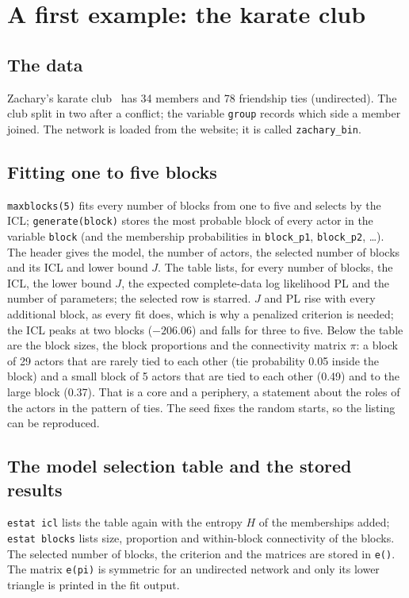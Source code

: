 \chapter{A first example: the karate club}\label{ch:karate}

\section{The data}
Zachary's karate club~\cite{zachary1977} has 34 members and 78 friendship ties (undirected). The club split in two after a conflict; the variable \texttt{group} records which side a member joined. The network is loaded from the website; it is called \texttt{zachary\_bin}.

\section{Fitting one to five blocks}
\texttt{maxblocks(5)} fits every number of blocks from one to five and selects by the ICL; \texttt{generate(block)} stores the most probable block of every actor in the variable \texttt{block} (and the membership probabilities in \texttt{block\_p1}, \texttt{block\_p2}, \dots).
The header gives the model, the number of actors, the selected number of blocks and its ICL and lower bound $J$. The table lists, for every number of blocks, the ICL, the lower bound $J$, the expected complete-data log likelihood PL and the number of parameters; the selected row is starred. $J$ and PL rise with every additional block, as every fit does, which is why a penalized criterion is needed; the ICL peaks at two blocks ($-206.06$) and falls for three to five. Below the table are the block sizes, the block proportions and the connectivity matrix $\pi$: a block of 29 actors that are rarely tied to each other (tie probability 0.05 inside the block) and a small block of 5 actors that are tied to each other (0.49) and to the large block (0.37). That is a core and a periphery, a statement about the roles of the actors in the pattern of ties. The seed fixes the random starts, so the listing can be reproduced.

\section{The model selection table and the stored results}
\texttt{estat icl} lists the table again with the entropy $H$ of the memberships added; \texttt{estat blocks} lists size, proportion and within-block connectivity of the blocks. The selected number of blocks, the criterion and the matrices are stored in \texttt{e()}.
The matrix \texttt{e(pi)} is symmetric for an undirected network and only its lower triangle is printed in the fit output.

